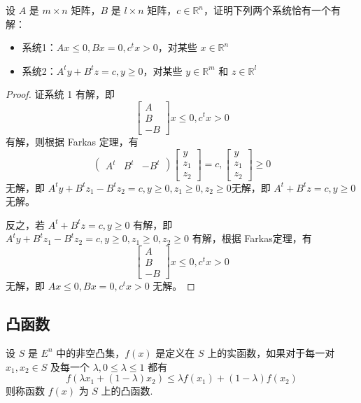 \begin{example}
    设 $A$ 是 $m\times n$ 矩阵，$B$ 是 $l \times n$ 矩阵，$c\in\mathbb{R}^n$，证明下列两个系统恰有一个有解：
    \begin{itemize}
        \item 系统1：$Ax \le 0, Bx = 0, c^tx > 0$，对某些 $x\in\mathbb{R}^n$
        \item 系统2：$A^ty + B^tz = c, y \ge 0$，对某些 $y \in \mathbb{R}^m$ 和 $z\in\mathbb{R}^l$
    \end{itemize}  

    \begin{proof}
        证系统 1 有解，即
        \[
            \begin{bmatrix}
                A\\
                B\\
                -B
            \end{bmatrix}x\le 0, c^tx>0
        \]
        有解，则根据 Farkas 定理，有
        \[
            \begin{pmatrix}
                A^t & B^t & -B^t
            \end{pmatrix}\begin{bmatrix}
                y\\
                z_1\\
                z_2
            \end{bmatrix}=c,\begin{bmatrix}
                y\\
                z_1\\
                z_2
            \end{bmatrix}\ge 0
        \]
        无解，即 $A^ty + B^tz_1 - B^tz_2 = c, y\ge 0, z_1\ge 0, z_2\ge 0$无解，即 $A^t + B^tz = c, y\ge 0$ 无解。
        
        反之，若 $A^t + B^tz = c, y\ge 0$ 有解，即 $A^ty + B^tz_1 - B^tz_2 = c, y\ge 0, z_1\ge 0, z_2\ge 0$ 有解，根据 Farkas定理，有 
        \[
            \begin{bmatrix}
                A\\
                B\\
                -B
            \end{bmatrix}x\le 0, c^tx>0
        \]
        无解，即 $Ax \le 0, Bx = 0, c^tx > 0$ 无解。
    \end{proof}
\end{example}

\subsection{凸函数}
\begin{definition}[凸函数]
    设 $S$ 是 $E^n$ 中的非空凸集，$f(x)$ 是定义在 $S$ 上的实函数，如果对于每一对 $x_1, x_2 \in S$ 及每一个 $\lambda, 0\le \lambda \le 1$ 都有 \[f(\lambda x_1 + (1 - \lambda)x_2) \le \lambda f(x_1) + (1 - \lambda)f(x_2)\]
    则称函数 $f(x)$ 为 $S$ 上的凸函数.
\end{definition}

